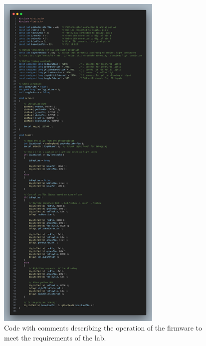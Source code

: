 \documentclass{article}
\begin{document}
	\begin{figure}[H]
	    \centering
	    \includegraphics[width=0.7\textwidth]{code}
	    \caption{Code with comments describing the operation of the firmware to meet the requirements of the lab.}
	\end{figure}
\end{document}
